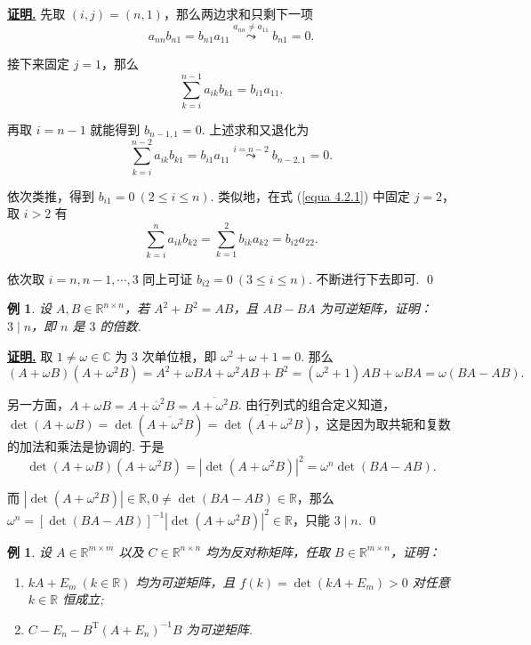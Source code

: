 \documentclass[10pt,openany]{article}
\theoremstyle{thmstyle} %
\theoremstyle{defstyle} %
\theoremstyle{prostyle} %
\theoremstyle{exastyle}
\newtheorem{example}[theorem]{例}
\theoremstyle{remstyle}
\renewenvironment{proof}[1][证明]{\par\underline{\textbf{#1.}} \;\fangsong}{\qed\par}
\newcommand{\T}{^{\text{T}}}
\newcommand{\C}{\mathbb{C}}
\newcommand{\R}{\mathbb{R}}
\newcommand{\n}{^{n \times n}}
\begin{document}
\begin{proof}
	先取 \( (i,j)=(n,1) \)，那么两边求和只剩下一项
	\[ a_{nn}b_{n1}=b_{n1}a_{11} \overset{a_{nn} \neq a_{11}}{\leadsto} b_{n1}=0. \]
	
	接下来固定 \( j=1 \)，那么
	\[ \sum_{k=i}^{n-1} a_{ik}b_{k1}=b_{i1}a_{11}. \]
	
	再取 \( i=n-1 \) 就能得到 \( b_{n-1,1}=0 \). 上述求和又退化为
	\[ \sum_{k=i}^{n-2} a_{ik}b_{k1}=b_{i1}a_{11} \overset{i=n-2}{\leadsto} b_{n-2,1}=0. \]
	
	依次类推，得到 \( b_{i1}=0 \ (2 \leq i \leq n) \). 类似地，在式 (\ref{equa 4.2.1}) 中固定 \( j=2 \)，取 \( i>2 \) 有
	\[ \sum_{k=i}^{n} a_{ik}b_{k2}= \sum_{k=1}^{2} b_{ik}a_{k2}= b_{i2}a_{22}. \]
	
	依次取 \( i=n, n-1,\cdots,3 \) 同上可证 \( b_{i2}=0 \ (3 \leq i \leq n) \). 不断进行下去即可.
\end{proof}


\begin{example}
	设 \( A,B \in \R\n \)，若 \( A^2+B^2=AB \)，且 \( AB-BA \) 为可逆矩阵，证明：\( 3 \mid n \)，即 \( n \) 是 \( 3 \) 的倍数.
\end{example}

\begin{proof}
	取 \( 1 \neq \omega \in \C \) 为 \( 3 \) 次单位根，即 \( \omega^2+\omega+1=0 \). 那么
	\[ (A+\omega B)(A+\omega^2 B)=A^2+\omega BA+ \omega^2 AB+ B^2=(\omega^2+1)AB+\omega BA=\omega (BA-AB). \]
	
	另一方面，\( A+\omega B=A+\overline{\omega}^2 B=\overline{A+\omega^2 B} \). 由行列式的组合定义知道，\( \det (A+\omega B)= \det (\overline{A+\omega^2 B})=\overline{ \det(A+\omega^2 B)} \)，这是因为取共轭和复数的加法和乘法是协调的. 于是
	\[ \det (A+\omega B)(A+\omega^2 B)= |\det(A+\omega^2 B)|^2= \omega^n \det (BA-AB). \]
	
	而 \( |\det(A+\omega^2 B)| \in \R, 0 \neq \det (BA-AB) \in \R \)，那么 \( \omega^n=[\det (BA-AB)]^{-1} |\det(A+\omega^2 B)|^2 \in \R \)，只能 \( 3 \mid n \).
\end{proof}

\begin{example} \label{4.2.4}
	设 \( A \in \R^{m \times m} \) 以及 \( C \in \R\n \) 均为反对称矩阵，任取 \(  B \in \R^{m \times n}  \)，证明：
	\begin{enumerate}[(1)]
		\item \( kA+E_m \ (k \in \R) \) 均为可逆矩阵，且 \( f(k)=\det(kA+E_m)>0 \) 对任意 \( k \in \R \) 恒成立;
		\item \( C-E_n-B\T(A+E_n)^{-1}B \) 为可逆矩阵.
	\end{enumerate}
\end{example}
\end{document}
